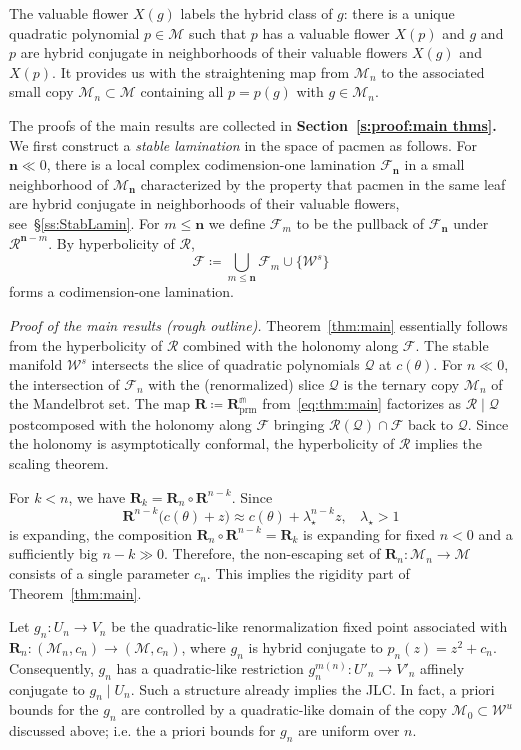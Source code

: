 \documentclass{amsart}
\renewcommand{\sp}{{\ \ }}
\newcommand{\1}{{\mathbb 1 }}
\newcommand{\Mandel}{{\mathcal{M}}}
\newcommand\MM{\mathscr{M}}
\newcommand\bMM{{\pmb {\MM}}}
\newcommand\RR{\mathcal{R}}
\newcommand\mRR{\boldsymbol R}%
\newcommand\prm{{\operatorname{prm}}}
\newcommand\mRRc{ \boldsymbol R_{\prm}}%
\newcommand{\bbn}{{\mathbf n}}
\newcommand{\str}{{\star}}
\newcommand{\mm}{\mathbb{m}}
\newcommand\WW{\mathcal{W}}
\newcommand\QQ{\mathcal{Q}}
\newcommand\Unst{{\boldsymbol{\mathcal{W}}^u}}
\newcommand{\bFol}{{\boldsymbol{ \mathcal F}}}
\theoremstyle{remark}
\numberwithin{equation}{section}
\theoremstyle{definition}
\theoremstyle{nonumberbreak}
\begin{document}
The valuable flower $X(g)$ labels the hybrid class of $g$: there is a unique quadratic polynomial $p\in \Mandel$ such that $p$ has a valuable flower $X(p)$ and $g$ and $p$ are hybrid conjugate in neighborhoods of their valuable flowers $X(g)$ and $X(p)$. It provides us with the straightening map from $\MM_n$ to the associated small copy $\Mandel_n\subset \Mandel$ containing all $p=p(g)$ with $g\in \MM_n$.





The proofs of the main results are collected in {\bf Section~\ref{s:proof:main thms}.} We first construct a \emph{stable lamination} in the space of pacmen as follows. For $\bbn\ll 0$, there is a local complex codimension-one lamination $\bFol_\bbn$ in a small neighborhood of $\MM_\bbn$ characterized by the property that pacmen in the same leaf are hybrid conjugate in neighborhoods of their valuable flowers, see~\S\ref{ss:StabLamin}. For $m\le \bbn$ we define $\bFol_m$ to be the pullback of $\bFol_\bbn$ under $\RR^{\bbn-m}$. By hyperbolicity of $\RR$,
\[\bFol\coloneqq \bigcup_{m\le \bbn} \bFol_m\cup \{\WW^s\}\] 
forms a codimension-one lamination. 


\emph{Proof of the main results (rough outline).}  Theorem~\ref{thm:main} essentially follows from the hyperbolicity of $\RR$ combined with the holonomy along $\bFol$. The stable manifold $\WW^s$ intersects the slice of quadratic polynomials $\QQ$ at $c(\theta)$. For $n\ll 0$, the intersection of $\bFol_n$ with the (renormalized) slice $\QQ$ is the ternary copy $\Mandel_n$ of the Mandelbrot set. The map $\mRR\coloneqq \mRRc^\mm$ from~\eqref{eq:thm:main} factorizes as $\RR\mid \QQ$ postcomposed with the holonomy along $\bFol$ bringing $\RR(\QQ)\cap \bFol$ back to $\QQ$. Since the holonomy is  asymptotically conformal, the hyperbolicity of $\RR$ implies the scaling theorem.



For $k< n$, we have $\mRR_k=\mRR_n\circ \mRR^{n-k}$. Since \[\mRR^{n-k}\big( c(\theta) +z\big)\approx c(\theta) +\lambda_\str ^{n-k} z,\sp\sp \lambda_\str>1\] is expanding, the composition $\mRR_n\circ \mRR^{n-k}=\mRR_k$ is expanding for fixed $n<0$ and a sufficiently big $n-k \gg 0$. Therefore, the non-escaping set of $\mRR_n\colon \Mandel_n\to \Mandel$ consists of a single parameter $c_n$. This implies the rigidity part of Theorem~\ref{thm:main}.  


Let $g_n\colon U_n\to V_n$ be the quadratic-like renormalization fixed point associated with $\mRR_n\colon (\Mandel_n,c_n)\to (\Mandel,c_n)$, where $g_n$ is hybrid conjugate to $p_n(z)=z^2+c_n$. Consequently, $g_n$ has a quadratic-like restriction $g_n^{m(n)}\colon U'_n\to V'_n$ affinely conjugate to $g_n\mid U_n$. Such a structure already implies the JLC. In fact, a priori bounds for the $g_n$ are controlled by a quadratic-like domain of the copy $\bMM_0\subset \Unst$ discussed above; i.e. the a priori bounds for $g_n$ are uniform over $n$.
\end{document}
